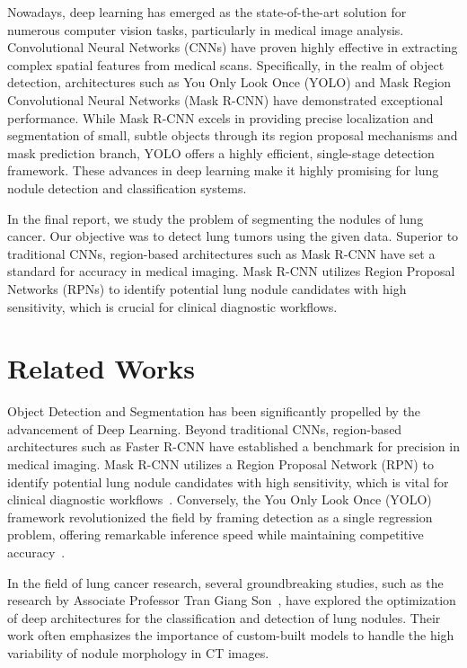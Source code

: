 \documentclass[conference]{IEEEtran}
\begin{document}
Nowadays, deep learning has emerged as the state-of-the-art solution for numerous computer vision tasks, particularly in medical image analysis. Convolutional Neural Networks (CNNs) have proven highly effective in extracting complex spatial features from medical scans. Specifically, in the realm of object detection, architectures such as You Only Look Once (YOLO) and Mask Region Convolutional Neural Networks (Mask R-CNN) have demonstrated exceptional performance. While Mask R-CNN excels in providing precise localization and segmentation of small, subtle objects through its region proposal mechanisms and mask prediction branch, YOLO offers a highly efficient, single-stage detection framework. These advances in deep learning make it highly promising for lung nodule detection and classification systems. 

In the final report, we study the problem of segmenting the nodules of lung cancer. Our objective was to detect lung tumors using the given data. Superior to traditional CNNs, region-based architectures such as Mask R-CNN have set a standard for accuracy in medical imaging. Mask R-CNN utilizes Region Proposal Networks (RPNs) to identify potential lung nodule candidates with high sensitivity, which is crucial for clinical diagnostic workflows.



\section{Related Works}
Object Detection and Segmentation has been significantly propelled by the advancement of Deep Learning. Beyond traditional CNNs, region-based architectures such as Faster R-CNN have established a benchmark for precision in medical imaging. Mask R-CNN utilizes a Region Proposal Network (RPN) to identify potential lung nodule candidates with high sensitivity, which is vital for clinical diagnostic workflows~\cite{He2017}. Conversely, the You Only Look Once (YOLO) framework revolutionized the field by framing detection as a single regression problem, offering remarkable inference speed while maintaining competitive accuracy~\cite{Ultralytics2025}.


In the field of lung cancer research, several groundbreaking studies, such as the research by Associate Professor Tran Giang Son~\cite{Tran2019}, have explored the optimization of deep architectures for the classification and detection of lung nodules. Their work often emphasizes the importance of custom-built models to handle the high variability of nodule morphology in CT images.
\end{document}
